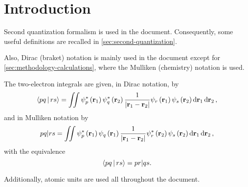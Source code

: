 \graphicspath{{./figures/}}

\section{Introduction}
Second quantization formalism is used in the document. 
Consequently, some useful definitions are recalled
in \cref{sec:second-quantization}.

Also, Dirac (braket) notation is mainly used in the document except for 
\cref{sec:methodology-calculations}, where the Mulliken (chemistry) notation
is used.

The two-electron integrals are given, in Dirac notation, by 
\begin{equation} \label{eq:dirac-notation}
    \Braket{pq | rs} =
    \iint 
    \psi_p^{*} \left( \mat{r}_1 \right)
    \psi_q^{*} \left( \mat{r}_2 \right)
    \frac{1}{\left| \mat{r}_1 - \mat{r}_2 \right|}
    \psi_r \left( \mat{r}_1 \right)
    \psi_s \left( \mat{r}_2 \right)
    \dd{ \mat{r}_1} \dd{ \mat{r}_2}
    ,
\end{equation}
and in Mulliken notation by
\begin{equation} \label{eq:mulliken-notation}
    \PBraket{pq | rs} =
    \iint 
    \psi_p^{*} \left( \mat{r}_1 \right)
    \psi_q     \left( \mat{r}_1 \right)
    \frac{1}{\left| \mat{r}_1 - \mat{r}_2 \right|}
    \psi_r^{*} \left( \mat{r}_2 \right)
    \psi_s     \left( \mat{r}_2 \right)
    \dd{ \mat{r}_1} \dd{ \mat{r}_2}
    ,
\end{equation}
with the equivalence 
\begin{equation} \label{eq:dirac-mulliken-equivalence}
    \Braket{pq | rs} = \PBraket{pr | qs}
    .
\end{equation}

Additionally, atomic units are used all throughout the document.

